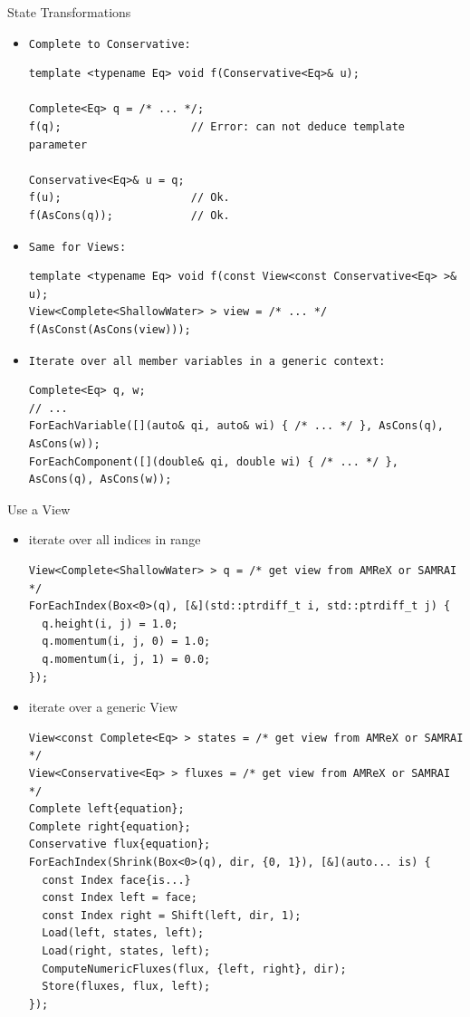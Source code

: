 \documentclass[ucs,9pt]{beamer}
\begin{document}
\begin{frame}[fragile]{State Transformations}
\begin{itemize}
\item \texttt{Complete to Conservative:}
\begin{lstlisting}
template <typename Eq> void f(Conservative<Eq>& u);

Complete<Eq> q = /* ... */;
f(q);                    // Error: can not deduce template parameter

Conservative<Eq>& u = q;
f(u);                    // Ok.
f(AsCons(q));            // Ok.
\end{lstlisting}
\item \texttt{Same for Views:}
\begin{lstlisting}
template <typename Eq> void f(const View<const Conservative<Eq> >& u);
View<Complete<ShallowWater> > view = /* ... */ 
f(AsConst(AsCons(view)));
\end{lstlisting}
\item \texttt{Iterate over all member variables in a generic context:}
\begin{lstlisting}
Complete<Eq> q, w;
// ...
ForEachVariable([](auto& qi, auto& wi) { /* ... */ }, AsCons(q), AsCons(w));
ForEachComponent([](double& qi, double wi) { /* ... */ }, AsCons(q), AsCons(w));
\end{lstlisting}
\end{itemize}
\end{frame}

\begin{frame}[fragile]{Use a View}
\begin{itemize}
\item iterate over all indices in range
\begin{lstlisting}
View<Complete<ShallowWater> > q = /* get view from AMReX or SAMRAI */
ForEachIndex(Box<0>(q), [&](std::ptrdiff_t i, std::ptrdiff_t j) {
  q.height(i, j) = 1.0;
  q.momentum(i, j, 0) = 1.0;
  q.momentum(i, j, 1) = 0.0;
}); 
\end{lstlisting}
\item iterate over a generic View
\begin{lstlisting}
View<const Complete<Eq> > states = /* get view from AMReX or SAMRAI */
View<Conservative<Eq> > fluxes = /* get view from AMReX or SAMRAI */
Complete left{equation};
Complete right{equation};
Conservative flux{equation};
ForEachIndex(Shrink(Box<0>(q), dir, {0, 1}), [&](auto... is) {
  const Index face{is...}
  const Index left = face;
  const Index right = Shift(left, dir, 1);
  Load(left, states, left);
  Load(right, states, left);
  ComputeNumericFluxes(flux, {left, right}, dir);
  Store(fluxes, flux, left);
}); 
\end{lstlisting}
\end{itemize}
\end{frame}
\end{document}
